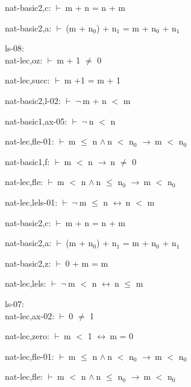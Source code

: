 \documentclass[a4paper]{article}
\newcommand{\Fol}{\mbox{$\vdash\ $}}
\newcommand{\Not}{\mbox{$\neg\ $}}
\newcommand{\And}{\mbox{$\wedge\ $}}
\newcommand{\Imp}{\mbox{$\rightarrow\ $}}
\newcommand{\Equiv}{\mbox{$\leftrightarrow\ $}}
\begin{document}
nat-basic2,c: 
 \Fol m + n = n + m



nat-basic2,a: 
 \Fol (m + $\mbox{n}_{0}$) + $\mbox{n}_{1}$ = m + $\mbox{n}_{0}$ + $\mbox{n}_{1}$



\bigskip

ls-08:\\ nat-lec,oz: 
 \Fol m + 1 $\neq$ 0



nat-lec,succ: 
 \Fol m +1 = m + 1



nat-basic2,l-02: 
 \Fol \Not m + n $<$ m



nat-basic1,ax-05: 
 \Fol \Not n $<$ n



nat-lec,fle-01: 
 \Fol m $\le$ n \And n $<$ $\mbox{n}_{0}$ \Imp m $<$ $\mbox{n}_{0}$



nat-basic1,f: 
 \Fol m $<$ n \Imp n $\neq$ 0



nat-lec,fle: 
 \Fol m $<$ n \And n $\le$ $\mbox{n}_{0}$ \Imp m $<$ $\mbox{n}_{0}$



nat-lec,lels-01: 
 \Fol \Not m $\le$ n \Equiv n $<$ m



nat-basic2,c: 
 \Fol m + n = n + m



nat-basic2,a: 
 \Fol (m + $\mbox{n}_{0}$) + $\mbox{n}_{1}$ = m + $\mbox{n}_{0}$ + $\mbox{n}_{1}$



nat-basic2,z: 
 \Fol 0 + m = m



nat-lec,lels: 
 \Fol \Not m $<$ n \Equiv n $\le$ m



\bigskip

ls-07:\\ nat-lec,ax-02: 
 \Fol 0 $\neq$ 1



nat-lec,zero: 
 \Fol m $<$ 1 \Equiv m = 0



nat-lec,fle-01: 
 \Fol m $\le$ n \And n $<$ $\mbox{n}_{0}$ \Imp m $<$ $\mbox{n}_{0}$



nat-lec,fle: 
 \Fol m $<$ n \And n $\le$ $\mbox{n}_{0}$ \Imp m $<$ $\mbox{n}_{0}$
\end{document}
